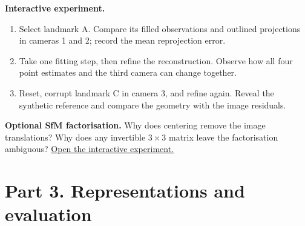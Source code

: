 \documentclass[11pt,a4paper]{article}
\begin{document}
\par\medskip
\noindent\textbf{Interactive experiment.}
\begin{enumerate}[nosep]
\item Select landmark A.
Compare its filled observations and outlined projections in cameras 1 and 2; record the mean reprojection error.
\item Take one fitting step, then refine the reconstruction.
Observe how all four point estimates and the third camera can change together.
\item Reset, corrupt landmark C in camera 3, and refine again.
Reveal the synthetic reference and compare the geometry with the image residuals.
\end{enumerate}
\noindent\textbf{Optional SfM factorisation.} Why does centering remove the image translations?
Why does any invertible $3\times 3$ matrix leave the factorisation ambiguous?
\noindent\href{https://sosekie.github.io/Unibe-CVG-CV-Interactive-Labs/tutorial-10/#sfm}{Open the interactive experiment.}
\section*{Part 3. Representations and evaluation}
\end{document}
